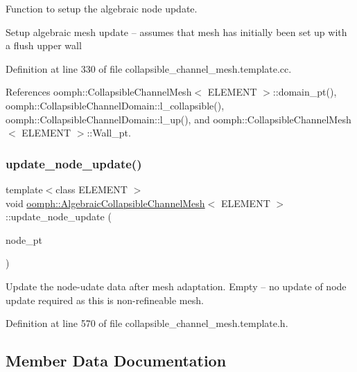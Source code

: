 Function to setup the algebraic node update. 

Setup algebraic mesh update -- assumes that mesh has initially been set up with a flush upper wall 

Definition at line 330 of file collapsible\+\_\+channel\+\_\+mesh.\+template.\+cc.



References oomph\+::\+Collapsible\+Channel\+Mesh$<$ E\+L\+E\+M\+E\+N\+T $>$\+::domain\+\_\+pt(), oomph\+::\+Collapsible\+Channel\+Domain\+::l\+\_\+collapsible(), oomph\+::\+Collapsible\+Channel\+Domain\+::l\+\_\+up(), and oomph\+::\+Collapsible\+Channel\+Mesh$<$ E\+L\+E\+M\+E\+N\+T $>$\+::\+Wall\+\_\+pt.

\mbox{\label{classoomph_1_1AlgebraicCollapsibleChannelMesh_abad38fb50d067a126af1161a3a603972}} 
\subsubsection{\texorpdfstring{update\+\_\+node\+\_\+update()}{update\_node\_update()}}
{\footnotesize\ttfamily template$<$class E\+L\+E\+M\+E\+NT $>$ \\
void \hyperlink{classoomph_1_1AlgebraicCollapsibleChannelMesh}{oomph\+::\+Algebraic\+Collapsible\+Channel\+Mesh}$<$ E\+L\+E\+M\+E\+NT $>$\+::update\+\_\+node\+\_\+update (\begin{DoxyParamCaption}\item[{Algebraic\+Node $\ast$\&}]{node\+\_\+pt }\end{DoxyParamCaption})\hspace{0.3cm}{\ttfamily [inline]}}



Update the node-\/udate data after mesh adaptation. Empty -- no update of node update required as this is non-\/refineable mesh. 



Definition at line 570 of file collapsible\+\_\+channel\+\_\+mesh.\+template.\+h.



\subsection{Member Data Documentation}
\mbox{\label{classoomph_1_1AlgebraicCollapsibleChannelMesh_ab3848ae5c357f45addf4bcfeca1a9d18}} 
